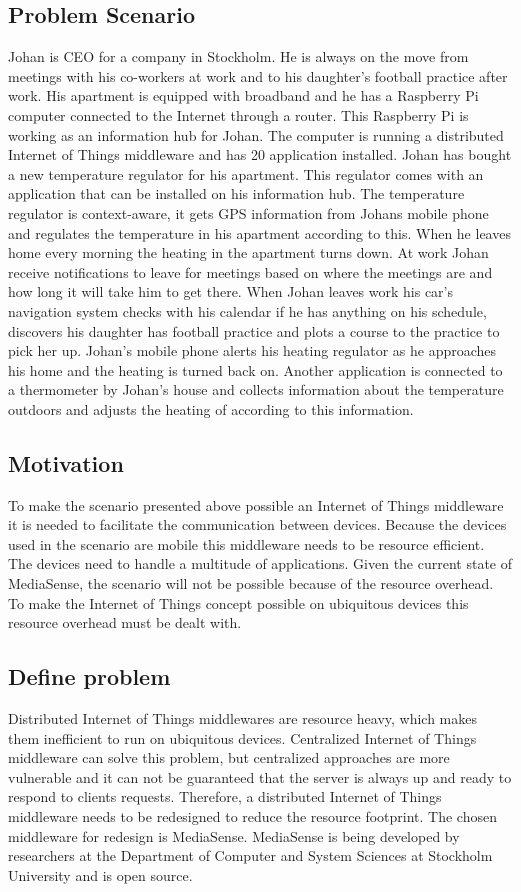 \subsection{Problem Scenario}
Johan is CEO for a company in Stockholm. He is always on the move from meetings with his co-workers at work and to his daughter's football practice after work. His apartment is equipped with broadband and he has a Raspberry Pi computer connected to the Internet through a router. This Raspberry Pi is working as an information hub for Johan. The computer is running a distributed Internet of Things middleware and has 20 application installed. Johan has bought a new temperature regulator for his apartment. This regulator comes with an application that can be installed on his information hub. The temperature regulator is context-aware, it gets GPS information from Johans mobile phone and regulates the temperature in his apartment according to this. When he leaves home every morning the heating in the apartment turns down. At work Johan receive notifications to leave for meetings based on where the meetings are and how long it will take him to get there. When Johan leaves work his car's navigation system checks with his calendar if he has anything on his schedule, discovers his daughter has football practice and plots a course to the practice to pick her up. Johan's mobile phone alerts his heating regulator as he approaches his home and the heating is turned back on. Another application is connected to a thermometer by Johan's house and collects information about the temperature outdoors and adjusts the heating of according to this information.

\subsection{Motivation}
To make the scenario presented above possible an Internet of Things middleware it is needed to facilitate the communication between devices. Because the devices used in the scenario are mobile this middleware needs to be resource efficient. The devices need to handle a multitude of applications. Given the current state of MediaSense, the scenario will not be possible because of the resource overhead. To make the Internet of Things concept possible on ubiquitous devices this resource overhead must be dealt with.

\subsection{Define problem}
Distributed Internet of Things middlewares are resource heavy, which makes them inefficient to run on ubiquitous devices. Centralized Internet of Things middleware can solve this problem, but centralized approaches are more vulnerable and it can not be guaranteed that the server is always up and ready to respond to clients requests. Therefore, a distributed Internet of Things middleware needs to be redesigned to reduce the resource footprint. The chosen middleware for redesign is MediaSense. MediaSense is being developed by researchers at the Department of Computer and System Sciences at Stockholm University and is open source. 


